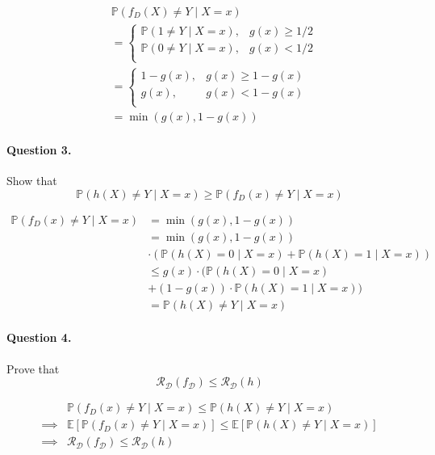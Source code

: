 \documentclass{article}
\newcommand{\E}{\mathbb{E}}
\renewcommand{\P}{\mathbb{P}}
\begin{document}
\begin{align*}
   & \P(f_D (X) \neq Y \mid X = x) \\
   & =
  \begin{cases}
    \P(1 \neq Y \mid X = x), & g(x) \geq 1/2 \\
    \P(0 \neq Y \mid X = x), & g(x) < 1/2    \\
  \end{cases}        \\
   & =
  \begin{cases}
    1 - g(x), & g(x) \geq 1-g(x) \\
    g(x),     & g(x) < 1 - g(x)  \\
  \end{cases}        \\
   & = \min (g(x), 1-g(x))
\end{align*}

\paragraph{Question 3.}
Show that
\begin{equation*}
  \P(h(X) \neq Y \mid X=x) \geq \P (f_D(x) \neq Y \mid X=x)
\end{equation*}

\begin{align*}
  \P (f_D(x) \neq Y \mid X=x)
   & = \min (g(x), 1-g(x))                             \\
   & = \min (g(x), 1-g(x))                             \\
   & \cdot (\P(h(X)=0 \mid X=x) + \P(h(X)=1 \mid X=x)) \\
   & \leq g(x) \cdot (\P(h(X)=0 \mid X=x)              \\
   & + (1-g(x)) \cdot \P(h(X)=1 \mid X=x))             \\
   & = \P(h(X) \neq Y \mid X=x)
\end{align*}

\paragraph{Question 4.}
Prove that
\begin{equation*}
  \mathcal{R}_\mathcal{D} (f_\mathcal{D}) \leq \mathcal{R}_\mathcal{D} (h)
\end{equation*}

\begin{align*}
           &
  \P (f_D(x) \neq Y \mid X=x) \leq \P(h(X) \neq Y \mid X=x)                               \\
  \implies &
  \E\left[\P (f_D(x) \neq Y \mid X=x)\right] \leq \E\left[\P(h(X) \neq Y \mid X=x)\right] \\
  \implies &
  \mathcal{R}_\mathcal{D} (f_\mathcal{D}) \leq \mathcal{R}_\mathcal{D} (h)
\end{align*}
\end{document}
